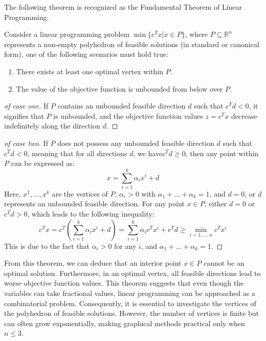 The following theorem is recognized as the Fundamental Theorem of Linear Programming.
\begin{theorem}
    Consider a linear programming problem $\min\{c^Tx|x \in P\}$, where $P \subseteq \mathbb{R}^n$ represents a non-empty polyhedron of feasible solutions (in standard or canonical form), one of the following scenarios must hold true:
    \begin{enumerate}
        \item There exists at least one optimal vertex within $P$.
        \item The value of the objective function is unbounded from below over $P$.
    \end{enumerate}
\end{theorem}
\begin{proof}[of case one]
    If $P$ contains an unbounded feasible direction $d$ such that $c^Td < 0$, it signifies that $P$ is unbounded, and the objective function values $z=c^Tx$ decrease indefinitely along the direction $d$. 
\end{proof}
\begin{proof}[of case two]
    If $P$ does not possess any unbounded feasible direction $d$ such that $c^Td < 0$, meaning that for all directions $d$, we have$c^Td \geq 0$, then any point within $P$ can be expressed as: 
    \[x=\sum_{i=1}^k{\alpha_ix^i + d}\]
    Here, $x^1,\dots,x^k$ are the vertices of $P$, $\alpha_i > 0$ with $\alpha_1+\dots+\alpha_k=1$, and $d = 0$, or $d$ represents an unbounded feasible direction.
    For any point $x \in P$, either $d = 0$ or $c^Td > 0$, which leads to the following inequality:
    \[c^Tx=c^T\left(\sum_{i=1}^{k}{\alpha_ix^i+d}\right)=\sum_{i=1}^{k}{\alpha_ic^Tx^i+c^Td}\geq\min_{i=1,\dots,n}{c^Tx^i}\]
    This is due to the fact that $\alpha_i > 0$ for any $i$, and $\alpha_1+\dots+\alpha_k=1$. 
\end{proof}
From this theorem, we can deduce that an interior point $x \in P$ cannot be an optimal solution. 
Furthermore, in an optimal vertex, all feasible directions lead to worse objective function values.
This theorem suggests that even though the variables can take fractional values, linear programming can be approached as a combinatorial problem.
Consequently, it is essential to investigate the vertices of the polyhedron of feasible solutions.
However, the number of vertices is finite but can often grow exponentially, making graphical methods practical only when $n \leq 3$. 
